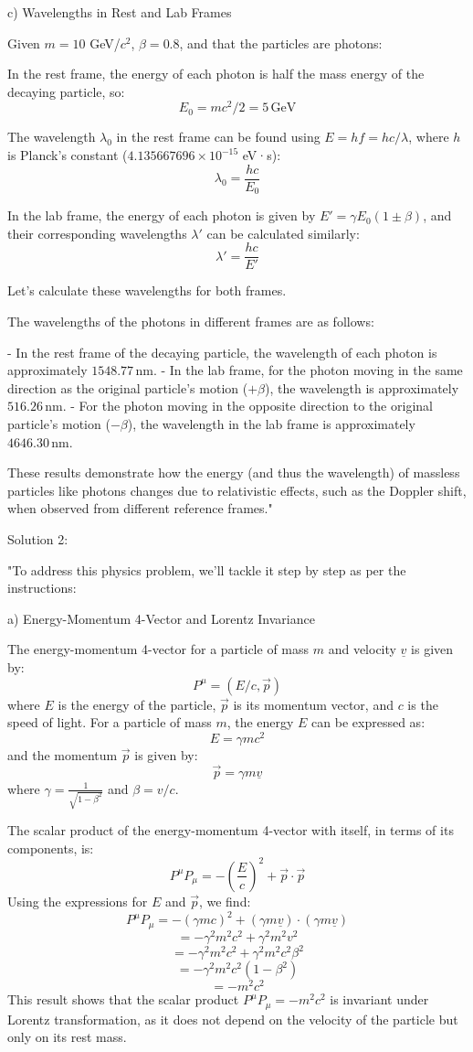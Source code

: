 c) Wavelengths in Rest and Lab Frames

Given $m = 10$ GeV/$c^2$, $\beta = 0.8$, and that the particles are photons:

In the rest frame, the energy of each photon is half the mass energy of the decaying particle, so:
\[ E_0 = mc^2 / 2 = 5 \, \text{GeV} \]

The wavelength $\lambda_0$ in the rest frame can be found using $E = hf = hc/\lambda$, where $h$ is Planck's constant ($4.135667696 \times 10^{-15}$ eV·s):
\[ \lambda_0 = \frac{hc}{E_0} \]

In the lab frame, the energy of each photon is given by $E' = \gamma E_0 (1 \pm \beta)$, and their corresponding wavelengths $\lambda'$ can be calculated similarly:
\[ \lambda' = \frac{hc}{E'} \]

Let's calculate these wavelengths for both frames.

The wavelengths of the photons in different frames are as follows:

- In the rest frame of the decaying particle, the wavelength of each photon is approximately $1548.77 \, \text{nm}$.
- In the lab frame, for the photon moving in the same direction as the original particle's motion ($+\beta$), the wavelength is approximately $516.26 \, \text{nm}$.
- For the photon moving in the opposite direction to the original particle's motion ($-\beta$), the wavelength in the lab frame is approximately $4646.30 \, \text{nm}$.

These results demonstrate how the energy (and thus the wavelength) of massless particles like photons changes due to relativistic effects, such as the Doppler shift, when observed from different reference frames."

Solution 2:

"To address this physics problem, we'll tackle it step by step as per the instructions:

a) Energy-Momentum 4-Vector and Lorentz Invariance

The energy-momentum 4-vector for a particle of mass \(m\) and velocity \(\underline{v}\) is given by:
\[ P^\mu = (E/c, \vec{p}) \]
where \(E\) is the energy of the particle, \(\vec{p}\) is its momentum vector, and \(c\) is the speed of light. For a particle of mass \(m\), the energy \(E\) can be expressed as:
\[ E = \gamma m c^2 \]
and the momentum \(\vec{p}\) is given by:
\[ \vec{p} = \gamma m \underline{v} \]
where \(\gamma = \frac{1}{\sqrt{1-\beta^2}}\) and \(\beta = v/c\).

The scalar product of the energy-momentum 4-vector with itself, in terms of its components, is:
\[ P^\mu P_\mu = -\left(\frac{E}{c}\right)^2 + \vec{p} \cdot \vec{p} \]
Using the expressions for \(E\) and \(\vec{p}\), we find:
\[ P^\mu P_\mu = -\left(\gamma m c\right)^2 + \left(\gamma m \underline{v}\right) \cdot \left(\gamma m \underline{v}\right) \]
\[ = -\gamma^2 m^2 c^2 + \gamma^2 m^2 v^2 \]
\[ = -\gamma^2 m^2 c^2 + \gamma^2 m^2 c^2 \beta^2 \]
\[ = -\gamma^2 m^2 c^2 (1 - \beta^2) \]
\[ = -m^2 c^2 \]
This result shows that the scalar product \(P^\mu P_\mu = -m^2 c^2\) is invariant under Lorentz transformation, as it does not depend on the velocity of the particle but only on its rest mass.

